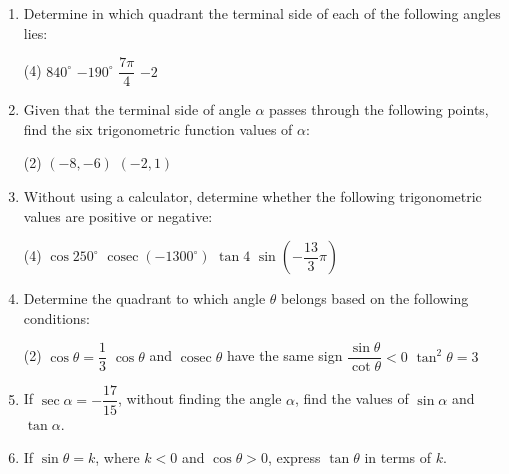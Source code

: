 \documentclass{report}
\begin{document}
\newpage


\begin{enumerate}
    \item Determine in which quadrant the terminal side of each of the following angles lies:
    \begin{tasks}[label=(\alph*)](4)
        \task $840^\circ$
        \task $-190^\circ$
        \task \vspace*{-1.2em}$\dfrac{7 \pi}{4}$
        \task $-2$
    \end{tasks}

    \item Given that the terminal side of angle $\alpha$ passes through the following points, find the six trigonometric function values of $\alpha$:
    \begin{tasks}[label=(\alph*)](2)
        \task $(-8,-6)$
        \task $(-2,1)$
    \end{tasks}

    \item Without using a calculator, determine whether the following trigonometric values are positive or negative:
    \begin{tasks}[label=(\alph*)](4)
        \task $\cos 250^\circ$
        \task $\operatorname{cosec} \left(-1300^\circ\right)$
        \task $\tan 4$
        \task $\sin \left(-\dfrac{13}{3} \pi\right)$
    \end{tasks}

    \item Determine the quadrant to which angle $\theta$ belongs based on the following conditions:
    \begin{tasks}[label=(\alph*)](2)
            \task \vspace*{-2.4em}$\cos \theta = \dfrac{1}{3}$
            \task $\cos \theta$ and $\operatorname{cosec} \theta$ have the same sign
            \task $\dfrac{\sin \theta}{\cot \theta} < 0$
            \task \vspace*{-0.3em}$\tan^2 \theta = 3$
    \end{tasks}

    \item If $\sec \alpha = -\dfrac{17}{15}$, without finding the angle $\alpha$, find the values of $\sin \alpha$ and $\tan \alpha$.

    \item If $\sin \theta = k$, where $k < 0$ and $\cos \theta > 0$, express $\tan \theta$ in terms of $k$.
    

\end{enumerate}
\end{document}
